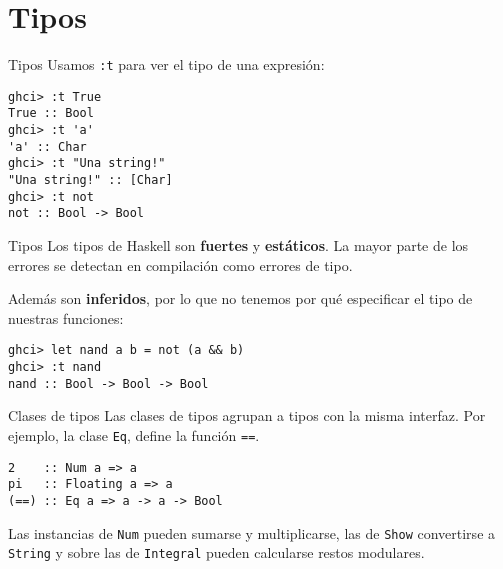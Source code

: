 \section{Tipos}

\begin{frame}[fragile]{Tipos}
  Usamos \texttt{:t} para ver el tipo de una expresión:
  \espacio
  \begin{lstlisting}
ghci> :t True
True :: Bool
ghci> :t 'a'
'a' :: Char
ghci> :t "Una string!"
"Una string!" :: [Char]
ghci> :t not
not :: Bool -> Bool
  \end{lstlisting}
\end{frame}

\begin{frame}[fragile]{Tipos}
  Los tipos de Haskell son \textbf{fuertes} y \textbf{estáticos}.
  La mayor parte de los errores se detectan en compilación como errores de tipo.

  \espacio

  Además son \textbf{inferidos}, por lo que no tenemos por qué especificar el
  tipo de nuestras funciones:

  \espacio

  \begin{lstlisting}
ghci> let nand a b = not (a && b)
ghci> :t nand
nand :: Bool -> Bool -> Bool
  \end{lstlisting}
\end{frame}


\begin{frame}[fragile]{Clases de tipos}
Las clases de tipos agrupan a tipos con la misma interfaz.
Por ejemplo, la clase \texttt{Eq}, define la función \texttt{==}.

\espacio

\begin{lstlisting}
2    :: Num a => a
pi   :: Floating a => a
(==) :: Eq a => a -> a -> Bool
\end{lstlisting}

\espacio

Las instancias de \texttt{Num} pueden sumarse y multiplicarse,
las de \texttt{Show} convertirse a \texttt{String}
y sobre las de \texttt{Integral} pueden calcularse restos modulares.
\end{frame}

